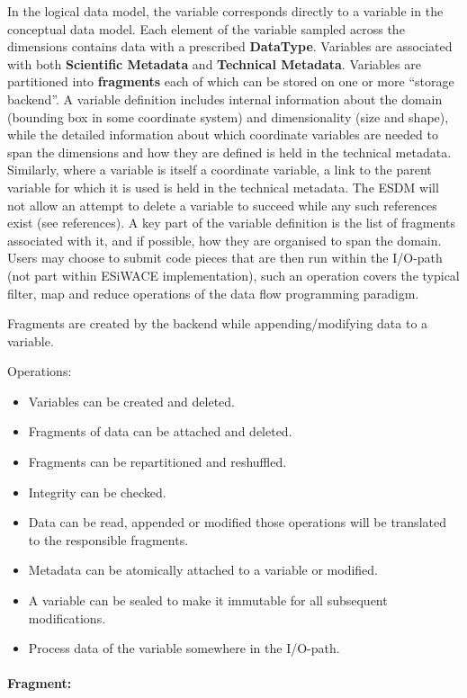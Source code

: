In the logical data model, the variable corresponds directly to a variable in the conceptual data model.
Each element of the variable sampled across the dimensions contains data with a prescribed \textbf{DataType}.
Variables are associated with both \textbf{Scientific Metadata} and \textbf{Technical Metadata}.
Variables are partitioned into \textbf{fragments} each of which can be stored on one or more ``storage backend''.
A variable definition includes internal information about the domain (bounding box in some coordinate system) and dimensionality (size and shape), while the detailed information about which coordinate variables are needed to span the dimensions and how they are defined is held in the technical metadata.
Similarly, where a variable is itself a coordinate variable, a link to the parent variable for which it is used is held in the technical metadata.
The ESDM will not allow an attempt to delete a variable to succeed while any such references exist (see references).
A key part of the variable definition is the list of fragments associated with it, and if possible, how they are organised to span the domain.
Users may choose to submit code pieces that are then run within the I/O-path (not part within ESiWACE implementation), such an operation covers the typical filter, map and reduce operations of the data flow programming paradigm.
 
Fragments are created by the backend while appending/modifying data to a variable.

Operations:

\begin{itemize}
  \item Variables can be created and deleted.
  \item Fragments of data can be attached and deleted.
  \item Fragments can be repartitioned and reshuffled.
  \item Integrity can be checked.
  \item Data can be read, appended or modified those operations will be translated to the responsible fragments.
  \item Metadata can be atomically attached to a variable or modified.
  \item A variable can be sealed to make it immutable for all subsequent modifications.
  \item Process data of the variable somewhere in the I/O-path.
\end{itemize}

\paragraph{Fragment:}%
\label{fragment}

